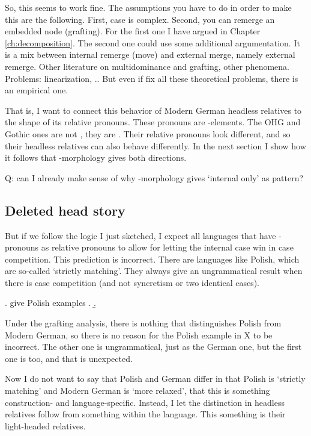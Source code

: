So, this seems to work fine. The assumptions you have to do in order to make this are the following. First, case is complex. Second, you can remerge an embedded node (grafting). For the first one I have argued in Chapter \ref{ch:decomposition}. The second one could use some additional argumentation. It is a mix between internal remerge (move) and external merge, namely external remerge. Other literature on multidominance and grafting, other phenomena. Problems: linearization, .. But even if fix all these theoretical problems, there is an empirical one.

That is, I want to connect this behavior of Modern German headless relatives to the shape of its relative pronouns. These pronouns are -elements. The OHG and Gothic ones are not , they are . Their relative pronouns look different, and so their headless relatives can also behave differently. In the next section I show how it follows that -morphology gives both directions.

Q: can I already make sense of why -morphology gives `internal only' as pattern?



\subsection{Deleted head story}

But if we follow the logic I just sketched, I expect all languages that have -pronouns as relative pronouns to allow for letting the internal case win in case competition. This prediction is incorrect. There are languages like Polish, which are so-called `strictly matching'. They always give an ungrammatical result when there is case competition (and not syncretism or two identical cases).

\ex. give Polish examples
\a.
\b.

Under the grafting analysis, there is nothing that distinguishes Polish from Modern German, so there is no reason for the Polish example in X to be incorrect. The other one is ungrammatical, just as the German one, but the first one is too, and that is unexpected.

Now I do not want to say that Polish and German differ in that Polish is `strictly matching' and Modern German is `more relaxed', that this is something construction- and language-specific. Instead, I let the distinction in headless relatives follow from something within the language. This something is their light-headed relatives.

